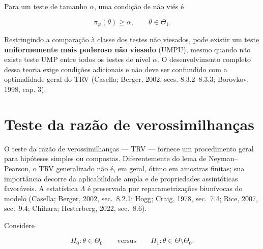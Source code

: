 \documentclass[
  letterpaper,
  DIV=11,
  numbers=noendperiod]{scrreprt}
\begin{document}
\begin{tcolorbox}[enhanced jigsaw, colback=white, leftrule=.75mm, colbacktitle=quarto-callout-note-color!10!white, breakable, titlerule=0mm, bottomtitle=1mm, title=\textcolor{quarto-callout-note-color}{\faInfo}\hspace{0.5em}{Observação: testes não viesados e UMPU}, colframe=quarto-callout-note-color-frame, toprule=.15mm, opacityback=0, bottomrule=.15mm, opacitybacktitle=0.6, arc=.35mm, toptitle=1mm, rightrule=.15mm, coltitle=black, left=2mm]

Para um teste de tamanho \(\alpha\), uma condição de não viés é

\[\pi_\varphi(\theta)\geq\alpha,
\qquad \theta\in\Theta_1.\]

Restringindo a comparação à classe dos testes não viesados, pode existir
um teste \textbf{uniformemente mais poderoso não viesado} (UMPU), mesmo
quando não existe teste UMP entre todos os testes de nível \(\alpha\). O
desenvolvimento completo dessa teoria exige condições adicionais e não
deve ser confundido com a optimalidade geral do TRV (Casella; Berger,
2002, secs. 8.3.2--8.3.3; Borovkov, 1998, cap. 3).

\end{tcolorbox}

\section{Teste da razão de
verossimilhanças}\label{teste-da-razuxe3o-de-verossimilhanuxe7as}

O teste da razão de verossimilhanças --- TRV --- fornece um procedimento
geral para hipóteses simples ou compostas. Diferentemente do lema de
Neyman--Pearson, o TRV generalizado não é, em geral, ótimo em amostras
finitas; sua importância decorre da aplicabilidade ampla e de
propriedades assintóticas favoráveis. A estatística \(\Lambda\) é
preservada por reparametrizações biunívocas do modelo (Casella; Berger,
2002, sec.~8.2.1; Hogg; Craig, 1978, sec.~7.4; Rice, 2007, sec.~9.4;
Chihara; Hesterberg, 2022, sec.~8.6).

Considere

\[H_0:\theta\in\Theta_0
\qquad\text{versus}\qquad
H_1:\theta\in\Theta\setminus\Theta_0.\]
\end{document}
